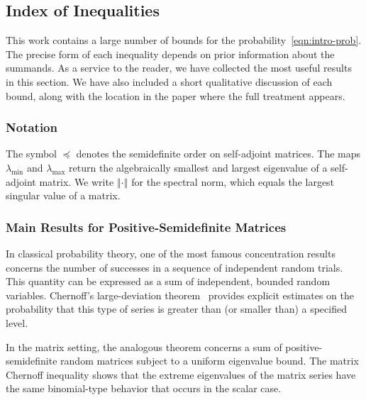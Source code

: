 \documentclass[11pt,letterpaper,twoside,reqno,draft]{amsart}
\theoremstyle{remark}
\numberwithin{equation}{section}
\numberwithin{thm}{section}
\begin{document}
\subsection{Index of Inequalities}

This work contains a large number of bounds for the probability~\eqref{eqn:intro-prob}.  The precise form of each inequality depends on prior information about the summands.  As a service to the reader, we have collected the most useful results in this section.  We have also included a short qualitative discussion of each bound, along with the location in the paper where the  full treatment appears.

\subsubsection{Notation}

The symbol ${\preccurlyeq}$ denotes the semidefinite order on self-adjoint matrices.  The maps $\lambda_{\min}$ and $\lambda_{\max}$ return the algebraically smallest and largest eigenvalue of a self-adjoint matrix.  We write ${\left\Vert {{ \cdot }} \right\Vert}$ for the spectral norm, which equals the largest singular value of a matrix.

\subsubsection{Main Results for Positive-Semidefinite Matrices}

In classical probability theory, one of the most famous concentration results concerns the number of successes in a sequence of independent random trials.  This quantity can be expressed as a sum of independent, bounded random variables.  Chernoff's large-deviation theorem~\cite{Che52:Measure-Asymptotic} provides explicit estimates on the probability that this type of series is greater than (or smaller than) a specified level.

In the matrix setting, the analogous theorem concerns a sum of positive-semidefinite random matrices subject to a uniform eigenvalue bound.  The matrix Chernoff inequality shows that the extreme eigenvalues of the matrix series have the same binomial-type behavior that occurs in the scalar case.
\end{document}
